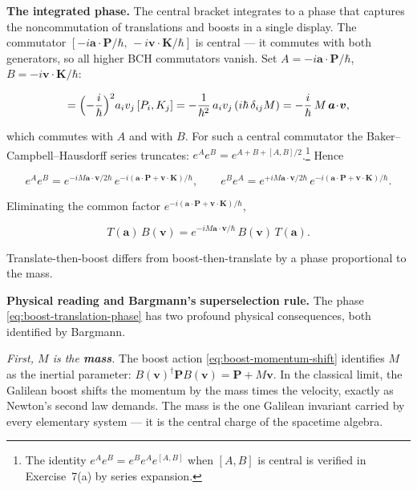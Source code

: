 \medskip\noindent\textbf{The integrated phase.} The central bracket integrates to a phase that captures the noncommutation of translations and boosts in a single display. The commutator $[-i\bm a\!\cdot\!\bm P/\hbar,\,-i\bm v\!\cdot\!\bm K/\hbar]$ is central --- it commutes with both generators, so all higher BCH commutators vanish. Set $A=-i\bm a\!\cdot\!\bm P/\hbar$, $B=-i\bm v\!\cdot\!\bm K/\hbar$:
\begin{linenomath}
\begin{equation*}
[A,B] = \Bigl(-\frac{i}{\hbar}\Bigr)^{2} a_i v_j\,[P_i,K_j]
      = -\frac{1}{\hbar^{2}}\,a_i v_j\,(i\hbar\,\delta_{ij}M)
      = -\frac{i}{\hbar}\,M\,\bm a\!\cdot\!\bm v,
\end{equation*}
\end{linenomath}
which commutes with $A$ and with $B$. For such a central commutator the Baker--Campbell--Hausdorff series truncates: $e^{A}e^{B}=e^{A+B+[A,B]/2}$.\footnote{The identity $e^{A}e^{B}=e^{B}e^{A}e^{[A,B]}$ when $[A,B]$ is central is verified in Exercise~7(a) by series expansion.} Hence
\begin{linenomath}
\begin{equation*}
e^{A}e^{B}=e^{-iM\bm a\cdot\bm v/2\hbar}\,e^{-i(\bm a\cdot\bm P+\bm v\cdot\bm K)/\hbar},
\qquad
e^{B}e^{A}=e^{+iM\bm a\cdot\bm v/2\hbar}\,e^{-i(\bm a\cdot\bm P+\bm v\cdot\bm K)/\hbar}.
\end{equation*}
\end{linenomath}
Eliminating the common factor $e^{-i(\bm a\cdot\bm P+\bm v\cdot\bm K)/\hbar}$,
\begin{linenomath}
\begin{equation}
T(\bm a)\,B(\bm v) = e^{-iM\bm a\cdot\bm v/\hbar}\,B(\bm v)\,T(\bm a).
\label{eq:boost-translation-phase}
\end{equation}
\end{linenomath}
Translate-then-boost differs from boost-then-translate by a phase proportional to the mass.

\medskip\noindent\textbf{Physical reading and Bargmann's superselection rule.} The phase \eqref{eq:boost-translation-phase} has two profound physical consequences, both identified by Bargmann.

\emph{First, $M$ is the \textbf{mass}.} The boost action \eqref{eq:boost-momentum-shift} identifies $M$ as the inertial parameter: $B(\bm v)^{\dagger}\bm P B(\bm v) = \bm P + M\bm v$. In the classical limit, the Galilean boost shifts the momentum by the mass times the velocity, exactly as Newton's second law demands. The mass is the one Galilean invariant carried by every elementary system --- it is the central charge of the spacetime algebra.

